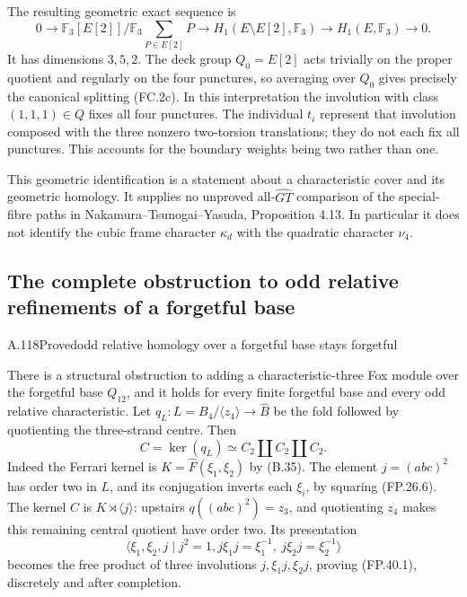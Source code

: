 The resulting geometric exact sequence is
\[
 0\longrightarrow
 \mathbb F_3[E[2]]\Big/\mathbb F_3\sum_{P\in E[2]}P
 \longrightarrow H_1(E\setminus E[2],\mathbb F_3)
 \longrightarrow H_1(E,\mathbb F_3)\longrightarrow0.
 \tag{FC.3b}
\]
It has dimensions $3,5,2$. The deck group $Q_0=E[2]$
acts trivially on the proper quotient and regularly on the four
punctures, so averaging over $Q_0$ gives precisely the canonical
splitting (FC.2c). In this interpretation the involution with
class $(1,1,1)\in Q$ fixes all four punctures. The individual
$t_i$ represent that involution composed with the three nonzero
two-torsion translations; they do not each fix all punctures.
This accounts for the boundary weights being two rather than one.

This geometric identification is a statement about a characteristic
cover and its geometric homology. It supplies no unproved
all-$\widehat{GT}$ comparison of the special-fibre paths in
Nakamura--Tsunogai--Yasuda, Proposition 4.13. In particular it does
not identify the cubic frame character $\kappa_d$ with the
quadratic character $\nu_4$.

\subsection{The complete obstruction to odd relative refinements of a forgetful base}


\begin{statement}{A.118}{Proved}{odd relative homology over a forgetful base stays forgetful}
\end{statement}
There is a structural obstruction to adding a characteristic-three
Fox module over the forgetful base $Q_{12}$, and it holds for
every finite forgetful base and every odd relative characteristic.
Let $q_L:L=B_4/\langle z_4\rangle\to\widehat B$ be the
fold followed by quotienting the three-strand centre. Then
\[
                  C=\ker(q_L)\simeq C_2\amalg C_2\amalg C_2.
 \tag{FP.40.1}
\]
Indeed the Ferrari kernel is $K=\widehat F(\xi_1,\xi_2)$
by (B.35). The element $j=(abc)^2$ has order two in $L$,
and its conjugation inverts each $\xi_i$, by squaring
(FP.26.6). The kernel $C$ is $K\rtimes\langle j\rangle$:
upstairs $q((abc)^2)=z_3$, and quotienting $z_4$ makes
this remaining central quotient have order two. Its presentation
\[
 \langle\xi_1,\xi_2,j\mid j^2=1,
           j\xi_1j=\xi_1^{-1},\ j\xi_2j=\xi_2^{-1}\rangle
\]
becomes the free product of three involutions
$j,\xi_1j,\xi_2j$, proving (FP.40.1), discretely and after
completion.

